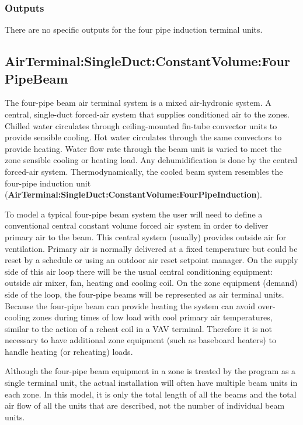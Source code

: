 \subsubsection{Outputs}\label{outputs-9}

There are no specific outputs for the four pipe induction terminal units.

\subsection{AirTerminal:SingleDuct:ConstantVolume:FourPipeBeam}\label{airterminalsingleductconstantvolumefourpipebeam}

The four-pipe beam air terminal system is a mixed air-hydronic system. A central, single-duct forced-air system that supplies conditioned air to the zones. Chilled water circulates through ceiling-mounted fin-tube convector units to provide sensible cooling. Hot water circulates through the same convectors to provide heating. Water flow rate through the beam unit is varied to meet the zone sensible cooling or heating load. Any dehumidification is done by the central forced-air system. Thermodynamically, the cooled beam system resembles the four-pipe induction unit (\textbf{AirTerminal:SingleDuct:ConstantVolume:FourPipeInduction}).

To model a typical four-pipe beam system the user will need to define a conventional central constant volume forced air system in order to deliver primary air to the beam. This central system (usually) provides outside air for ventilation. Primary air is normally delivered at a fixed temperature but could be reset by a schedule or using an outdoor air reset setpoint manager. On the supply side of this air loop there will be the usual central conditioning equipment: outside air mixer, fan, heating and cooling coil. On the zone equipment (demand) side of the loop, the four-pipe beams will be represented as air terminal units. Because the four-pipe beam can provide heating the system can avoid over-cooling zones during times of low load with cool primary air temperatures, similar to the action of a reheat coil in a VAV terminal. Therefore it is not necessary to have additional zone equipment (such as baseboard heaters) to handle heating (or reheating) loads.

Although the four-pipe beam equipment in a zone is treated by the program as a single terminal unit, the actual installation will often have multiple beam units in each zone. In this model, it is only the total length of all the beams and the total air flow of all the units that are described, not the number of individual beam units.

